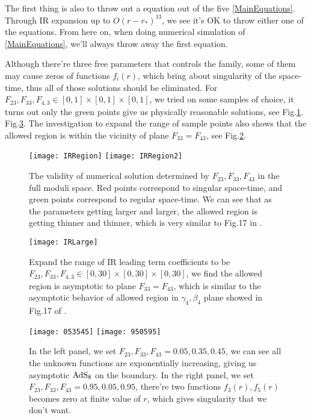 \documentclass[12pt, a4paper]{article}
\numberwithin{equation}{section}
\begin{document}
The first thing is also to throw out a equation out of the five \ref{MainEquations}. Through IR expansion up to $O(r-r_*)^{13}$, we see it's OK to throw either one of the equations. From here on, when doing numerical simulation of \ref{MainEquations}, we'll always throw away the first equation.

Although there're three free parameters that controls the family, some of them may cause zeros of functions $f_i(r)$, which bring about singularity of the space-time, thus all of those solutions should be eliminated. For $F_{23}, F_{33}, F_{4,3}\in [0,1]\times [0,1] \times[0,1]$, we tried on some samples of choice, it turns out only the green points give us physically reasonable solutions, see Fig.\ref{IRRegion}. Fig.\ref{950595}. The investigation to expand the range of sample points also shows that the allowed region is within the vicinity of plane $F_{33} = F_{43}$, see Fig.\ref{IRLarge}.

\begin{figure}[t]
	\centering
	\texttt{[image: IRRegion]}
	\hfil
	\texttt{[image: IRRegion2]}
	\caption{{\rm The validity of numerical solution determined by  $F_{23},F_{33},F_{43}$ in the full moduli space. Red points correspond to singular space-time, and green points correspond to regular space-time. We can see that as the parameters getting larger and larger, the allowed region is getting thinner and thinner, which is very similar to Fig.17 in \cite{Bobev:2016sh}.}}
	\label{IRRegion}
\end{figure}
\begin{figure}[t]
	\centering
	\texttt{[image: IRLarge]}
	\caption{{\rm Expand the range of IR leading term coefficients to be $F_{23}, F_{33}, F_{4,3}\in [0,30]\times [0,30] \times[0,30]$, we find the allowed region is asymptotic to plane $F_{33} = F_{43}$, which is similar to the asymptotic behavior of allowed region in $\gamma_4, \beta_4$ plane showed in Fig.17 of \cite{Bobev:2016sh}.}}
	\label{IRLarge}
\end{figure}
\begin{figure}[h]
	\texttt{[image: 053545]}
	\hfill
	\texttt{[image: 950595]}
	\caption{{\rm In the left panel, we set $F_{23},F_{33},F_{43} = 0.05, 0.35, 0.45$, we can see all the unknown functions are exponentially increasing, giving us asymptotic ${\rm AdS_8}$ on the boundary. In the right panel, we set $F_{23},F_{33},F_{43} = 0.95, 0.05, 0.95$, there're two functions $f_3(r), f_5(r)$ becomes zero at finite value of $r$, which gives singularity that we don't want.}}
	\label{950595}
\end{figure}	
\end{document}
